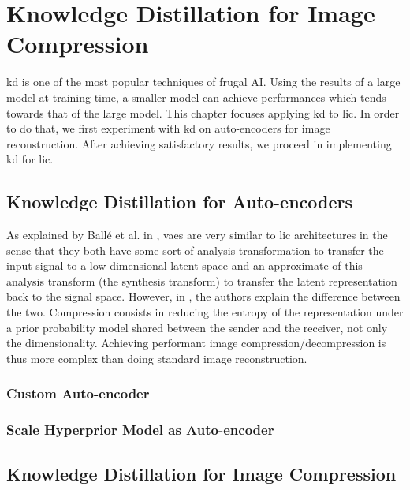 \chapter{Knowledge Distillation for Image Compression}
\label{part_2}
\acrfull{kd} is one of the most popular techniques of frugal AI. Using the results of a large model at training time, a smaller model can achieve performances which tends towards that of the large model. This chapter focuses applying \acrshort{kd} to \acrshort{lic}. In order to do that, we first experiment with \acrshort{kd} on auto-encoders for image reconstruction. After achieving satisfactory results, we proceed in implementing \acrshort{kd} for \acrshort{lic}.

\section{Knowledge Distillation for Auto-encoders}
As explained by Ballé et al. in \cite{ballé2018variationalimagecompressionscale}, \acrshort{vae}s are very similar to \acrshort{lic} architectures in the sense that they both have some sort of analysis transformation to transfer the input signal to a low dimensional latent space and an approximate of this analysis transform (the synthesis transform) to transfer the latent representation back to the signal space. However, in \cite{minnen2018jointautoregressivehierarchicalpriors}, the authors explain the difference between the two. Compression consists in reducing the entropy of the representation under a prior probability model shared between the sender and the receiver, not only the dimensionality. Achieving performant image compression/decompression is thus more complex than doing standard image reconstruction.

\subsection{Custom Auto-encoder}

\subsection{Scale Hyperprior Model as Auto-encoder}

\section{Knowledge Distillation for Image Compression}
